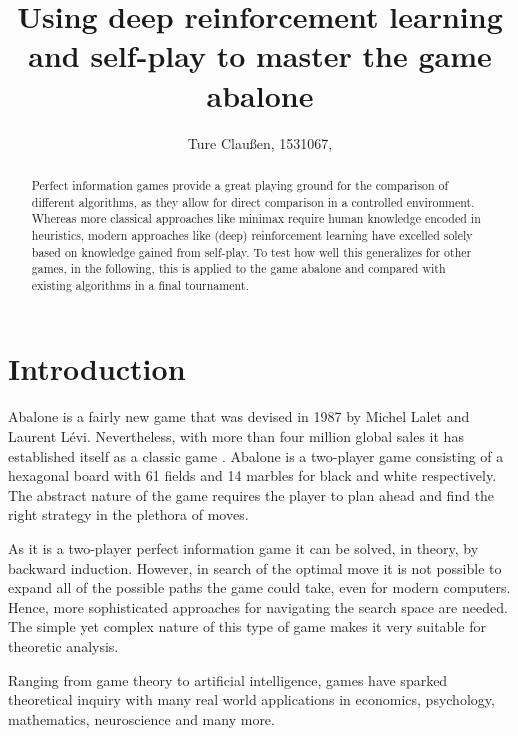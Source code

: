 \documentclass{../lib/llncs}
\begin{document}
\title{Using deep reinforcement learning and self-play to master the game abalone}
\author{Ture Claußen, 1531067, }

{\def\addcontentsline#1#2#3{}\maketitle} %

\begin{abstract}
  Perfect information games provide a great playing ground for the comparison of different algorithms, as they allow for direct comparison in a controlled environment. Whereas more classical approaches like minimax require human knowledge encoded in heuristics, modern approaches like (deep) reinforcement learning have excelled solely based on knowledge gained from self-play. To test how well this generalizes for other games, in the following, this is applied to the game abalone and compared with existing algorithms in a final tournament.
\end{abstract}


\section{Introduction}
Abalone is a fairly new game that was devised in 1987 by Michel Lalet and Laurent Lévi. Nevertheless, with more than four million global sales it has established itself as a classic game \cite{noauthor_abalone_2020}. Abalone is a two-player game consisting of a hexagonal board with 61 fields and 14 marbles for black and white respectively. The abstract nature of the game requires the player to plan ahead and find the right strategy in the plethora of moves.

As it is a two-player perfect information game it can be solved, in theory, by backward induction. However, in search of the optimal move it is not possible to expand all of the possible paths the game could take, even for modern computers. Hence, more sophisticated approaches for navigating the search space are needed. The simple yet complex nature of this type of game makes it very suitable for theoretic analysis. \cite[p. 1]{demichelis_simple_2004}

Ranging from game theory to artificial intelligence, games have sparked theoretical inquiry with many real world applications in economics, psychology, mathematics, neuroscience and many more. \cite[pp. 46]{russell_artificial_2021}
\end{document}
